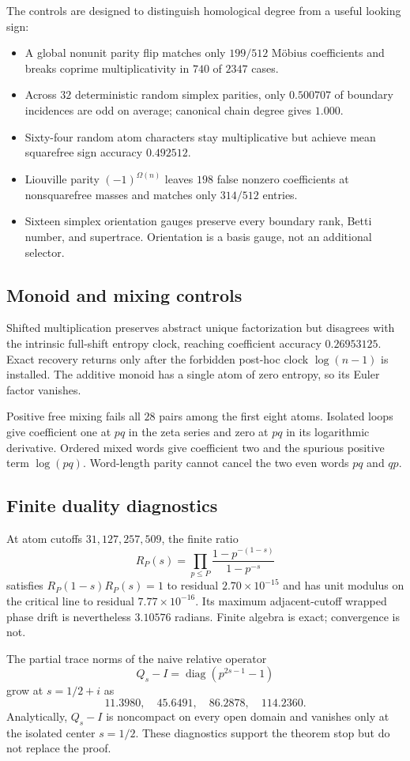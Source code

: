 The controls are designed to distinguish homological degree from a useful
looking sign:

\begin{itemize}
  \item A global nonunit parity flip matches only $199/512$ M\"obius
  coefficients and breaks coprime multiplicativity in $740$ of $2347$
  cases.
  \item Across $32$ deterministic random simplex parities, only
  $0.500707$ of boundary incidences are odd on average; canonical chain
  degree gives $1.000$.
  \item Sixty-four random atom characters stay multiplicative but achieve
  mean squarefree sign accuracy $0.492512$.
  \item Liouville parity $(-1)^{\Omega(n)}$ leaves $198$ false nonzero
  coefficients at nonsquarefree masses and matches only $314/512$ entries.
  \item Sixteen simplex orientation gauges preserve every boundary rank,
  Betti number, and supertrace. Orientation is a basis gauge, not an
  additional selector.
\end{itemize}

\subsection{Monoid and mixing controls}

Shifted multiplication preserves abstract unique factorization but disagrees
with the intrinsic full-shift entropy clock, reaching coefficient accuracy
$0.26953125$. Exact recovery returns only after the forbidden post-hoc clock
$\log(n-1)$ is installed. The additive monoid has a single atom of zero
entropy, so its Euler factor vanishes.

Positive free mixing fails all $28$ pairs among the first eight atoms.
Isolated loops give coefficient one at $pq$ in the zeta series and zero at
$pq$ in its logarithmic derivative. Ordered mixed words give coefficient
two and the spurious positive term $\log(pq)$. Word-length parity cannot
cancel the two even words $pq$ and $qp$.

\subsection{Finite duality diagnostics}

At atom cutoffs $31,127,257,509$, the finite ratio
\[
 R_P(s)=\prod_{p\le P}\frac{1-p^{-(1-s)}}{1-p^{-s}}
\]
satisfies $R_P(1-s)R_P(s)=1$ to residual $2.70\times10^{-15}$ and has unit
modulus on the critical line to residual $7.77\times10^{-16}$. Its maximum
adjacent-cutoff wrapped phase drift is nevertheless $3.10576$ radians.
Finite algebra is exact; convergence is not.

The partial trace norms of the naive relative operator
\[
 Q_s-I=\operatorname{diag}(p^{2s-1}-1)
\]
grow at $s=1/2+i$ as
\[
 11.3980,\quad45.6491,\quad86.2878,\quad114.2360.
\]
Analytically, $Q_s-I$ is noncompact on every open domain and vanishes only
at the isolated center $s=1/2$. These diagnostics support the theorem stop
but do not replace the proof.

